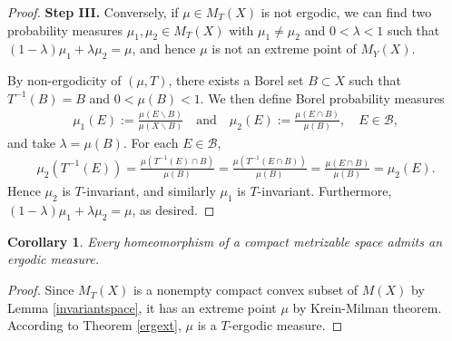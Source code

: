 \documentclass{article}
\numberwithin{equation}{section}
\newcommand{\scr}{\mathscr}
\theoremstyle{plain}
\newtheorem{corollary}[theorem]{Corollary}
\theoremstyle{definition}
\begin{document}
\begin{proof}
\item\textbf{Step III.} Conversely, if $\mu\in M_T(X)$ is not ergodic, we can find two probability measures $\mu_1,\mu_2\in M_T(X)$ with $\mu_1\neq\mu_2$ and $0<\lambda<1$ such that $(1-\lambda)\mu_1+\lambda\mu_2=\mu$, and hence $\mu$ is not an extreme point of $M_Y(X)$.

By non-ergodicity of $(\mu,T)$, there exists a Borel set $B\subset X$ such that $T^{-1}(B)=B$ and $0<\mu(B)<1$. We then define Borel probability measures
\begin{align*}
	\mu_1(E):=\frac{\mu(E\backslash B)}{\mu(X\backslash B)}\quad\text{and}\quad\mu_2(E):=\frac{\mu(E\cap B)}{\mu(B)},\quad E\in\scr{B},
\end{align*}
and take $\lambda=\mu(B)$. For each $E\in\scr{B}$,
\begin{align*}
\mu_2(T^{-1}(E))=\frac{\mu(T^{-1}(E)\cap B)}{\mu(B)}=\frac{\mu(T^{-1}(E\cap B))}{\mu(B)}=\frac{\mu(E\cap B)}{\mu(B)}=\mu_2(E).
\end{align*}
Hence $\mu_2$ is $T$-invariant, and similarly $\mu_1$ is $T$-invariant. Furthermore, $(1-\lambda)\mu_1+\lambda\mu_2=\mu$, as desired.
\end{proof}
\begin{corollary}
Every homeomorphism of a compact metrizable space admits an ergodic measure.
\end{corollary}
\begin{proof}
Since $M_T(X)$ is a nonempty compact convex subset of $M(X)$ by Lemma \ref{invariantspace}, it has an extreme point $\mu$ by Krein-Milman theorem. According to Theorem \ref{ergext}, $\mu$ is a $T$-ergodic measure.
\end{proof}
\end{document}
